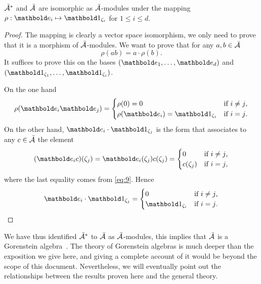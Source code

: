\begin{proposition}
  \label{th:gorenstein}
  $\bar{\mathcal{A}}^\ast$ and $\bar{\mathcal{A}}$ are isomorphic as
  $\bar{\mathcal{A}}$-modules under the mapping
  $\rho:\basis{e}_i\mapsto\basis{1}_{\zeta_i}$ for $1\le i\le d$.
\end{proposition}
\begin{proof}
  The mapping is clearly a vector space isomorphism, we only need to
  prove that it is a morphism of $\bar{\mathcal{A}}$-modules. We want
  to prove that for any $a,b\in\bar{\mathcal{A}}$
  \[\rho(ab) = a\cdot\rho(b)\text{.}\]
  It suffices to prove this on the bases
  $(\basis{e}_1,\ldots,\basis{e}_d)$ and
  $(\basis{1}_{\zeta_1},\ldots,\basis{1}_{\zeta_i})$.

  On the one hand
  \begin{equation}
    \label{eq:12}
    \rho(\basis{e}_i\basis{e}_j)=
    \begin{cases}
      \rho(0)=0 &\text{if $i\ne j$,}\\
      \rho(\basis{e}_i)=\basis{1}_{\zeta_i} &\text{if $i=j$.}
    \end{cases}
  \end{equation}
  On the other hand, $\basis{e_i}\cdot\basis{1_{\zeta_j}}$ is the form
  that associates to any $c\in\bar{\mathcal{A}}$ the element
  \begin{equation}
    \label{eq:13}
    (\basis{e_i}c)(\zeta_j) = \basis{e}_i(\zeta_j)c(\zeta_j) = 
    \begin{cases}
      0 &\text{if $i\ne j$,}\\
      c(\zeta_j) &\text{if $i=j$,}
    \end{cases}
  \end{equation}
  where the last equality comes from \eqref{eq:9}. Hence
  \begin{equation}
    \label{eq:14}
    \basis{e}_i\cdot\basis{1}_{\zeta_j}=
    \begin{cases}
      0 &\text{if $i\ne j$,}\\
      \basis{1}_{\zeta_i} &\text{if $i=j$.}
    \end{cases}
  \end{equation}
\end{proof}

\begin{nota}
  We have thus identified $\bar{\mathcal{A}}^\ast$ to
  $\bar{\mathcal{A}}$ as $\bar{\mathcal{A}}$-modules, this implies that
  $\bar{\mathcal{A}}$ is a Gorenstein algebra~\cite[Chapter
  8]{mourrain+elkadi}. The theory of Gorenstein algebras is much
  deeper than the exposition we give here, and giving a complete
  account of it would be beyond the scope of this
  document. Nevertheless, we will eventually point out the
  relationships between the results proven here and the general
  theory.
\end{nota}

